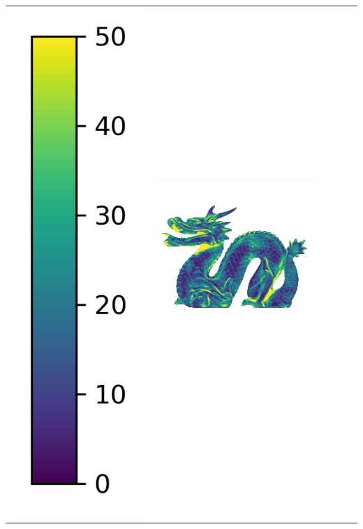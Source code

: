 \begin{center}
\begin{tabularx}{\linewidth}{@{}Y@{}Y@{}Y@{}Y@{}Y@{}Y@{}}
\includegraphics[width=0.2\linewidth]{semisynthetic/colorbar_error_vertical.png} &
\includegraphics[width=\linewidth]{semisynthetic/20160617_21_ours_err.png} &

\end{tabularx}
\end{center}
